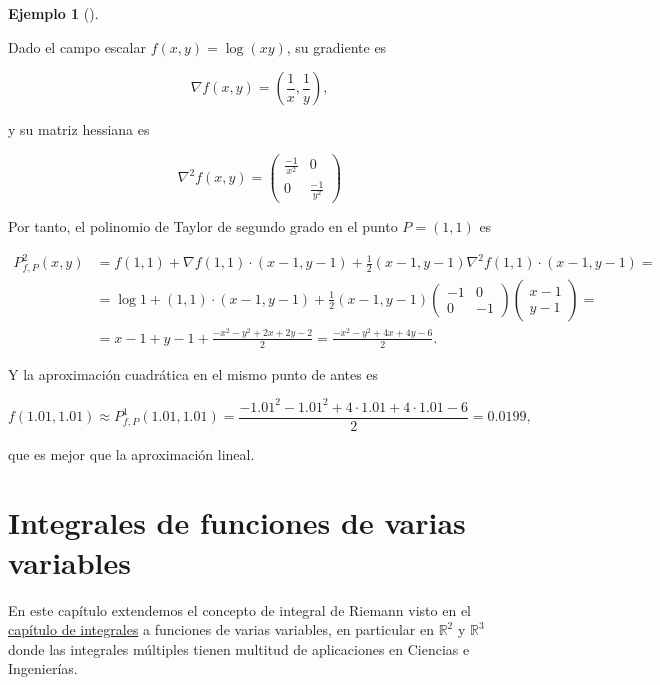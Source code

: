 \documentclass[
  a4paper,
]{scrreport}
\theoremstyle{plain}
\theoremstyle{definition}
\theoremstyle{plain}
\theoremstyle{plain}
\theoremstyle{definition}
\newtheorem{example}{Ejemplo}[chapter]
\theoremstyle{definition}
\theoremstyle{remark}
\begin{document}
\begin{example}[]\protect\hypertarget{exm-polinomio-taylor-funcion-varias-variables}{}\label{exm-polinomio-taylor-funcion-varias-variables}

Dado el campo escalar \(f(x,y)=\log(xy)\), su gradiente es

\[
\nabla f(x,y) = \left(\frac{1}{x},\frac{1}{y}\right),
\]

y su matriz hessiana es

\[
\nabla ^2 f(x,y) 
= \left(
\begin{array}{cc}
\frac{-1}{x^2} & 0\\
0 & \frac{-1}{y^2}
\end{array}
\right)
\]

Por tanto, el polinomio de Taylor de segundo grado en el punto
\(P=(1,1)\) es

\begin{align*}
P^2_{f,P}(x,y) &= f(1,1) +\nabla f(1,1)\cdot (x-1,y-1) + \frac{1}{2}(x-1,y-1)\nabla^2f(1,1)\cdot(x-1,y-1)=\\
&= \log 1+(1,1)\cdot(x-1,y-1) + \frac{1}{2}(x-1,y-1)
\left(
\begin{array}{cc}
-1 & 0\\
0 & -1
\end{array}
\right)
\left(
\begin{array}{c}
x-1\\
y-1
\end{array}
\right)
= \\
&= x-1+y-1+\frac{-x^2-y^2+2x+2y-2}{2} = \frac{-x^2-y^2+4x+4y-6}{2}.
\end{align*}

Y la aproximación cuadrática en el mismo punto de antes es

\[
f(1.01,1.01) \approx P^1_{f,P}(1.01,1.01) = \frac{-1.01^2-1.01^2+4\cdot 1.01+4\cdot 1.01-6}{2} = 0.0199,
\]

que es mejor que la aproximación lineal.

\end{example}


\chapter{Integrales de funciones de varias
variables}\label{integrales-de-funciones-de-varias-variables}

En este capítulo extendemos el concepto de integral de Riemann visto en
el \href{08-integrales.qmd}{capítulo de integrales} a funciones de
varias variables, en particular en \(\mathbb{R}^2\) y \(\mathbb{R}^3\)
donde las integrales múltiples tienen multitud de aplicaciones en
Ciencias e Ingenierías.
\end{document}
